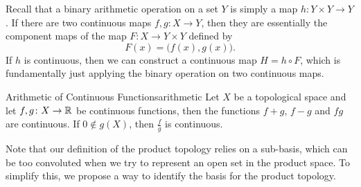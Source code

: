 \documentclass[math]{amznotes}
\theoremstyle{remark}
\begin{document}
Recall that a binary arithmetic operation on a set $Y$ is simply a map $h \colon Y \times Y \to Y$. If there are two continuous maps $f, g \colon X \to Y$, then they are essentially the component maps of the map $F \colon X \to Y \times Y$ defined by 
\begin{equation*}
    F\left(x\right) = \bigl(f\left(x\right), g\left(x\right)\bigr).
\end{equation*}
If $h$ is continuous, then we can construct a continuous map $H = h \circ F$, which is fundamentally just applying the binary operation on two continuous maps.
\begin{corbox}{Arithmetic of Continuous Functions}{arithmetic}
    Let $X$ be a topological space and let $f, g \colon X \to \mathbb{R}$ be continuous functions, then the functions $f + g$, $f - g$ and $fg$ are continuous. If $0 \notin g\left(X\right)$, then $\frac{f}{g}$ is continuous.
\end{corbox}
Note that our definition of the product topology relies on a sub-basis, which can be too convoluted when we try to represent an open set in the product space. To simplify this, we propose a way to identify the basis for the product topology.
\end{document}
